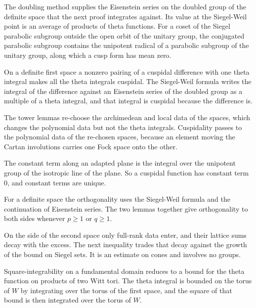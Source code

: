 The doubling method supplies the Eisenstein series on the doubled group of the
definite space that the next proof integrates against. Its value at the
Siegel-Weil point is an average of products of theta functions. For a coset of
the Siegel parabolic subgroup outside the open orbit of the unitary group, the
conjugated parabolic subgroup contains the unipotent radical of a parabolic
subgroup of the unitary group, along which a cusp form has mean zero.

On a definite first space a nonzero pairing of a cuspidal difference with one
theta integral makes all the theta integrals cuspidal. The Siegel-Weil formula
writes the integral of the difference against an Eisenstein series of the
doubled group as a multiple of a theta integral, and that integral is cuspidal
because the difference is.

The tower lemmas re-choose the archimedean and local data of the spaces, which
changes the polynomial data but not the theta integrals. Cuspidality passes to
the polynomial data of the re-chosen spaces, because an element moving the
Cartan involutions carries one Fock space onto the other.

The constant term along an adapted plane is the integral over the unipotent
group of the isotropic line of the plane. So a cuspidal function has constant
term $0$, and constant terms are unique.

For a definite space the orthogonality uses the Siegel-Weil formula and the
continuation of Eisenstein series. The two lemmas together give orthogonality
to both sides whenever $p\geq1$ or $q\geq1$.

On the side of the second space only full-rank data enter, and their lattice
sums decay with the excess. The next inequality trades that decay against the
growth of the bound on Siegel sets. It is an estimate on cones and involves no
groups.

Square-integrability on a fundamental domain reduces to a bound for the theta
function on products of two Witt tori. The theta integral is bounded on the
torus of $W$ by integrating over the torus of the first space, and the square
of that bound is then integrated over the torus of $W$.

